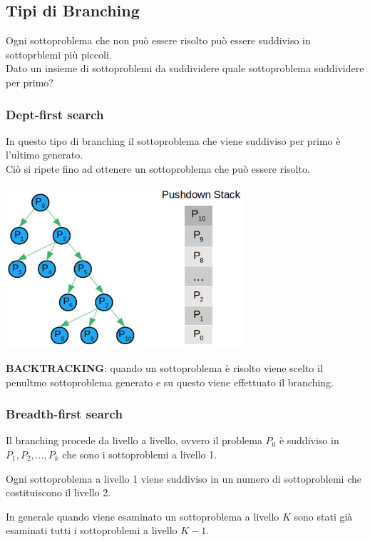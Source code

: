 \subsection{Tipi di Branching}
Ogni sottoproblema che non può essere risolto può essere suddiviso in sottoprblemi più piccoli.\\
Dato un insieme di sottoproblemi da suddividere quale sottoproblema suddividere per primo?

\subsubsection{Dept-first search}
In 	questo tipo di branching il sottoproblema che viene suddiviso per primo è l'ultimo generato.\\
Ciò si ripete fino ad ottenere un sottoproblema che può essere risolto.

\centerline{\includegraphics[height=6cm]{images/graph17.png}}

\textbf{BACKTRACKING}: quando un sottoproblema è risolto viene scelto il penultmo sottoproblema generato e su questo viene effettuato il branching.

\subsubsection{Breadth-first search}
Il branching procede da livello a livello, ovvero il problema $P_{0}$ è suddiviso in $P_{1},P_{2},...,P_{k}$ che sono i sottoproblemi a livello 1.

Ogni sottoproblema a livello 1 viene suddiviso in un numero di sottoproblemi che costituiscono il livello 2.

In generale quando viene esaminato un sottoproblema a livello $K$ sono stati già esaminati tutti i sottoproblemi a livello $K-1$.


